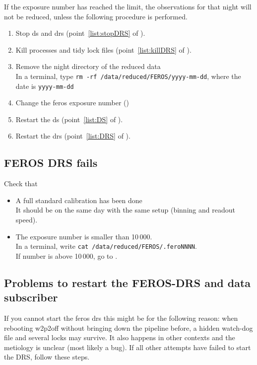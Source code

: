 \documentclass[11pt,fleqn,a4paper]{book}
\begin{document}
If the exposure number has reached the limit, the observations for that night will not be reduced, unless the following procedure is performed.

\label{proc:FEROSfix10000}
\begin{enumerate}
    \item Stop \gls{ds} and \gls{drs} (point~\ref{list:stopDRS} of ).
    \item Kill processes and tidy lock files (point~\ref{list:killDRS} of ).
    \item Remove the night directory of the reduced data\\
          In a terminal, type \texttt{rm -rf /data/reduced/FEROS/yyyy-mm-dd},
          where the date is \texttt{yyyy-mm-dd}
    \item Change the \gls{feros} exposure number ()
    \item Restart the \gls{ds} (point~\ref{list:DS} of ).
    \item Restart the \gls{drs} (point~\ref{list:DRS} of ).
\end{enumerate}


\subsection{FEROS DRS fails}

Check that
\begin{itemize}
    \item A full standard calibration has been done\\
          It should be on the same day with the same setup (binning and readout speed).
    \item The exposure number is smaller than 10\,000.\\
          In a terminal, write \texttt{cat /data/reduced/FEROS/.feroNNNN}.\\
          If number is above 10\,000, go to .
\end{itemize}

\subsection{Problems to restart the FEROS-DRS and data subscriber}


If you cannot start the \gls{feros} \gls{drs} this might be for the following reason: when rebooting \gls{w2p2off} without bringing down the pipeline before, a hidden watch-dog file and several locks may survive.  It also happens in other contexts and the metiology is unclear (most likely a bug). If all other attempts have failed to start the DRS, follow these steps.
\end{document}
